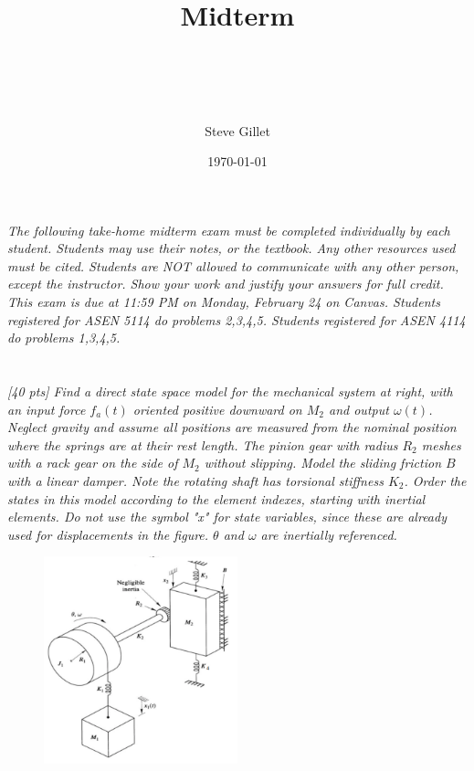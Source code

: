 \documentclass{article}
\title{Midterm \\ \className \\ \professorName \\ \taName}
\author{Steve Gillet}
\date{\today}
\begin{document}
\maketitle

\textit{The following take-home midterm exam must be completed individually by each student. Students may use their notes, or the textbook. Any other resources used must be cited. Students are NOT allowed to communicate with any other person, except the instructor. Show your work and justify your answers for full credit. This exam is due at 11:59 PM on Monday, February 24 on Canvas. Students registered for ASEN 5114 do problems 2,3,4,5. Students registered for ASEN 4114 do problems 1,3,4,5.}

\setcounter{section}{1}
\section{}

\textit{[40 pts] Find a direct state space model for the mechanical system at right, with an input force $f_a(t)$ oriented positive downward on $M_2$ and output $\omega(t)$. Neglect gravity and assume all positions are measured from the nominal position where the springs are at their rest length. The pinion gear with radius $R_2$ meshes with a rack gear on the side of $M_2$ without slipping. Model the sliding friction $B$ with a linear damper. Note the rotating shaft has torsional stiffness $K_2$. Order the states in this model according to the element indexes, starting with inertial elements. Do not use the symbol "x" for state variables, since these are already used for displacements in the figure. $\theta$ and $\omega$ are inertially referenced.}

\begin{figure}[H]
    \centering
    \includegraphics[width=0.5\textwidth]{q2fig.png}
\end{figure}
\end{document}
